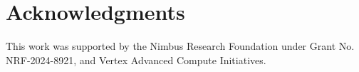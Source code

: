 \section*{Acknowledgments}
This work was supported by the Nimbus Research Foundation under Grant No. NRF-2024-8921, and Vertex Advanced Compute Initiatives.



